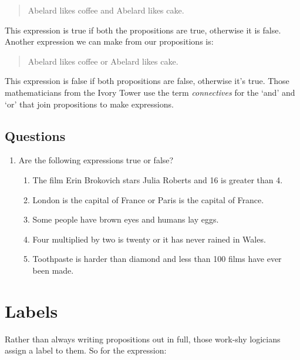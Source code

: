 \documentclass{article}
\begin{document}
    \begin{quote}
      \item Abelard likes coffee and Abelard likes cake.
    \end{quote}

    This expression is true if both the propositions are true, otherwise it is
    false. Another expression we can make from our propositions is:

    \begin{quote}
      \item Abelard likes coffee or Abelard likes cake.
    \end{quote}

    This expression is false if both propositions are false, otherwise it's
    true. Those mathematicians from the Ivory Tower use the term
    \emph{connectives} for the `and' and `or' that join propositions to make
    expressions.

    \subsection*{Questions}

      \begin{enumerate} 

        \item Are the following expressions true or false?
          \begin{enumerate}
            \item The film Erin Brokovich stars Julia Roberts and 16 is greater
              than 4.
            \item London is the capital of France or Paris is the capital of
              France.
            \item Some people have brown eyes and humans lay eggs.
            \item Four multiplied by two is twenty or it has never rained in
              Wales.
            \item Toothpaste is harder than diamond and less than 100 films
              have ever been made.
          \end{enumerate}

      \end{enumerate}

  \section{\label{sec:labels}Labels}

    Rather than always writing propositions out in full, those work-shy
    logicians assign a label to them. So for the expression:
\end{document}
